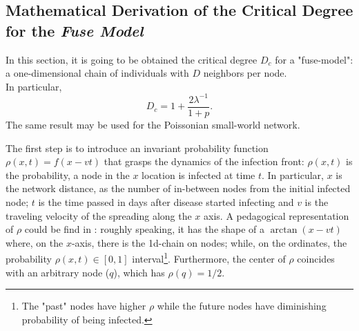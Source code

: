 \documentclass[a4paper,10pt,twoside]{book} %
\theoremstyle{definition}
\begin{document}
\subsection*{Mathematical Derivation of the Critical Degree for the \textit{Fuse Model} }

In this section, it is going to be obtained the critical degree $ D_c$  \cite{Thurner::NetBasedExpl} for a "fuse-model": a one-dimensional chain of individuals with $D$ neighbors per node.
\\In particular, 
\begin{equation}
	D_c = 1 + \frac{2 \lambda^{-1}}{1+p}.
	\label{eq:prelim_Dc_fusemodel}
\end{equation}
The same result may be used for the Poissonian small-world network.

The first step is to introduce an invariant probability function $\rho(x,t) = f(x-vt)$ that grasps the dynamics of the infection front: $\rho(x,t)$ is the probability, a node in the $x$ location is infected at time $t$.
In particular, $x$ is the network distance, as the number of in-between nodes from the initial infected node; $t$ is the time passed in days after disease started infecting and $v$ is the traveling velocity of the spreading along the $x$ axis.
A pedagogical representation of $\rho$ could be find in \cite{Thurner::Appendix_NetBasedExpl}: roughly speaking, it has the shape of a $\arctan(x-vt)$ where, on the $x$-axis, there is the 1d-chain on  nodes; while, on the ordinates, the probability $ \rho(x,t)\in [0,1]$ interval\footnote{The "past" nodes have higher $\rho$ while the future nodes have diminishing probability of being infected.}. Furthermore, the center of $ \rho$ coincides with an arbitrary node ($q$), which has $\rho(q) = 1/2$.
\end{document}
